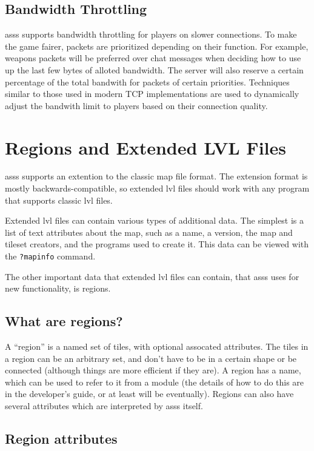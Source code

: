 \documentclass{article}
\newcommand{\asss}{asss}
\begin{document}
\subsection{Bandwidth Throttling}

\asss{} supports bandwidth throttling for players on slower connections.
To make the game fairer, packets are prioritized depending on their
function. For example, weapons packets will be preferred over chat
messages when deciding how to use up the last few bytes of alloted
bandwidth. The server will also reserve a certain percentage of the
total bandwith for packets of certain priorities. Techniques similar to
those used in modern TCP implementations are used to dynamically adjust
the bandwith limit to players based on their connection quality.


\section{Regions and Extended LVL Files}

\asss{} supports an extention to the classic map file format. The
extension format is mostly backwards-compatible, so extended lvl files
should work with any program that supports classic lvl files.

Extended lvl files can contain various types of additional data. The
simplest is a list of text attributes about the map, such as a name, a
version, the map and tileset creators, and the programs used to create
it. This data can be viewed with the \verb/?mapinfo/ command.

The other important data that extended lvl files can contain, that
\asss{} uses for new functionality, is regions.

\subsection{What are regions?}

A ``region'' is a named set of tiles, with optional assocated
attributes. The tiles in a region can be an arbitrary set, and don't
have to be in a certain shape or be connected (although things are more
efficient if they are). A region has a name, which can be used to refer
to it from a module (the details of how to do this are in the
developer's guide, or at least will be eventually). Regions can also
have several attributes which are interpreted by \asss{} itself.

\subsection{Region attributes}
\end{document}
